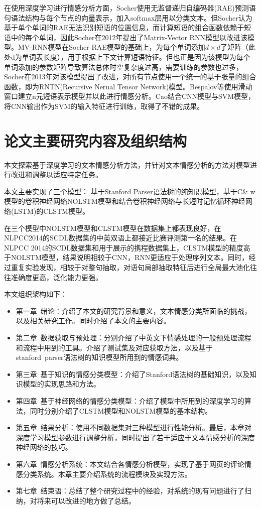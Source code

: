 在使用深度学习进行情感分析方面，Socher\cite{Socher2011}使用无监督递归自编码器(RAE)预测语句语法结构与每个节点的向量表示，加入softmax层用以分类文本。但Socher认为基于单个单词的RAE无法识别短语的位置信息，而计算短语的组合函数依赖于短语中的每个单词，因此Socher在2012年\cite{Socher2012}提出了Matrix-Vector RNN模型以改进该模型。MV-RNN模型在Socher RAE模型的基础上，为每个单词添加$d \times d$了矩阵（此处d为单词表长度），用于根据上下文计算短语特征。但也正是因为该模型为每个单词添加的参数矩阵导致算法总体时空复杂度过高，需要训练的参数也过多，Socher在2013年对该模型提出了改进\cite{Socher2013}，对所有节点使用一个统一的基于张量的组合函数，即为RNTN(Recursive Nerual Tensor Network)模型。Bespalov等\cite{Bespalov2011}使用滑动窗口建立n元短语表示模型并以此进行情感分析。Cao\cite{CaoXC15}结合CNN模型与SVM模型，将CNN输出作为SVM的输入特征进行训练，取得了不错的成果。
\section{论文主要研究内容及组织结构}
本文探索基于深度学习的文本情感分析方法，并针对文本情感分析的方法对模型进行改进和调整以适应特定任务。\par
本文主要实现了三个模型： 基于Stanford Parser语法树的纯知识模型，基于C\& w模型的卷积神经网络NOLSTM模型和结合卷积神经网络与长短时记忆循环神经网络(LSTM)的CLSTM模型。\par
在三个模型中NOLSTM模型和CLSTM模型在数据集上都表现良好，在NLPCC2014的SCDL数据集的中英双语上都接近比赛评测第一名的结果。在NLPCC 2014的SCDL数据集和用于展示的携程数据集上，CLSTM模型的精度高于NOLSTM模型，结果说明相较于CNN，RNN更适应于处理序列文本。同时，经过重复实验发现，相较于对整句抽取，对语句局部抽取特征后进行全局最大池化往往准确度更高，泛化能力更强。

本文组织架构如下：
\begin{itemize}
\item 第一章\ 绪论：介绍了本文的研究背景和意义，文本情感分类所面临的挑战，以及相关研究工作。同时介绍了本文的主要内容。
\item 第二章\ 数据获取与预处理：分别介绍了中英文下情感处理的一般预处理流程和流程中用到的工具。介绍了测试集及对应获取方法，以及基于stanford\ parser语法树的知识模型所用到的情感词典。
\item 第三章\ 基于知识的情感分类模型：介绍了Stanford语法树的基础知识，以及知识模型的实现思路和方法。
\item 第四章\ 基于神经网络的情感分类模型：介绍了模型中所用到的深度学习的算法，同时分别介绍了CLSTM模型和NOLSTM模型的基本结构。
\item 第五章\ 结果分析：使用不同数据集对三种模型进行性能分析。最后，本章对深度学习模型参数进行调整分析，同时提出了若干适应于文本情感分析的深度神经网络的技巧。
\item 第六章\ 情感分析系统：本文结合各情感分析模型，实现了基于网页的评论情感分类系统。本章主要介绍系统的流程模块及实现方法。
\item 第七章\ 结束语：总结了整个研究过程中的经验，对系统的现有问题进行了归纳，对将来可以改进的地方做了总结。
\end{itemize}